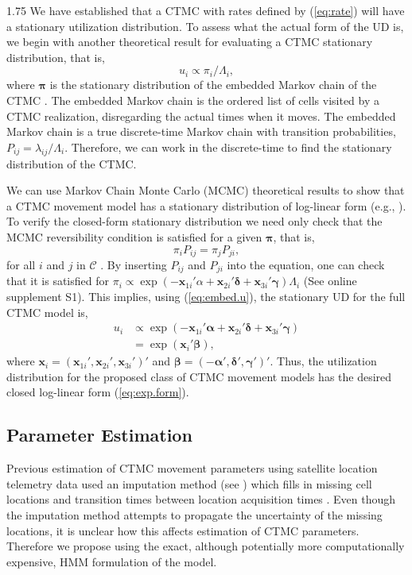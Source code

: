 \documentclass[12pt]{article}
\newcommand{\bx}{\ensuremath{\mathbf{x}}}
\newcommand{\bb}{\ensuremath{\boldsymbol{\beta}}}
\newcommand{\bg}{\ensuremath{\boldsymbol{\gamma}}}
\newcommand{\ba}{\ensuremath{\boldsymbol{\alpha}}}
\newcommand{\bd}{\ensuremath{\boldsymbol{\delta}}}
\newcommand{\bpi}{\ensuremath{\boldsymbol{\pi}}}
\newcommand{\fC}{\ensuremath{\mathcal{C}}}
\begin{document}
\begin{spacing}{1.75}
We have established that a CTMC with rates defined by (\ref{eq:rate}) will have a stationary utilization distribution. To assess what the actual form of the UD is, we begin with another theoretical result for evaluating a CTMC stationary distribution, that is,
\begin{equation}
\label{eq:embed.u}
u_i \propto \pi_i / \Lambda_i,
\end{equation}
where $\bpi$ is the stationary distribution of the embedded Markov chain of the CTMC \citep{norris1998markov, wilsonestimating}. The embedded Markov chain is the ordered list of cells visited by a CTMC realization, disregarding the actual times when it moves. The embedded Markov chain is a true discrete-time Markov chain with transition probabilities, $P_{ij} = \lambda_{ij}/\Lambda_i$.  Therefore, we can work in the discrete-time to find the stationary distribution of the CTMC.       
  
We can use Markov Chain Monte Carlo (MCMC) theoretical results to show that a CTMC movement model has a stationary distribution of log-linear form (e.g., \citealt{michelot2018linking,Blackwell2026a}). To verify the closed-form stationary distribution we need only check that the MCMC reversibility condition is satisfied for a given $\bpi$, that is,
\[
\pi_iP_{ij} = \pi_jP_{ji},
\]
for all $i$ and $j$ in $\fC$ \citep{Blackwell2026a}. By inserting $P_{ij}$ and $P_{ji}$ into the equation, one can check that it is satisfied for $\pi_i \propto \exp(-\bx_{1i}'\alpha + \bx_{2i}'\bd + \bx_{3i}'\bg)\Lambda_i$ (See online supplement S1). This implies, using (\ref{eq:embed.u}), the stationary UD for the full CTMC model is, 
\begin{equation}
\label{eq:u.exp}
\begin{aligned}
u_i &\propto \exp(-\bx_{1i}'\ba + \bx_{2i}'\bd + \bx_{3i}'\bg)\\
&= \exp(\bx_i'\bb),
\end{aligned}
\end{equation}
where $\bx_i = (\bx_{1i}', \bx_{2i}', \bx_{3i}')'$ and $\bb = (-\ba',\bd', \bg')'$. Thus, the utilization distribution for the proposed class of CTMC movement models has the desired closed log-linear form (\ref{eq:exp.form}). 
  
\subsection{Parameter Estimation}

Previous estimation of CTMC movement parameters using satellite location telemetry data used an imputation method (see \citealt{ScharfEtAl2017a}) which fills in missing cell locations and transition times between location acquisition times \citep{Hanks:2015aa, wilsonestimating, Johnson353516}. Even though the imputation method attempts to propagate the uncertainty of the missing locations, it is unclear how this affects estimation of CTMC parameters. Therefore we propose using the exact, although potentially more computationally expensive, HMM formulation of the model. 


\end{spacing}
\end{document}
